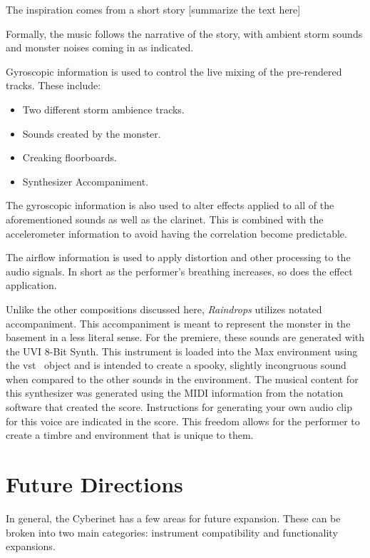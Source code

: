 The inspiration comes from a short story [summarize the text here]

Formally, the music follows the narrative of the story, with ambient storm sounds and monster noises coming in as indicated. 

Gyroscopic information is used to control the live mixing of the pre-rendered tracks. These include:
\begin{itemize}
    \item Two different storm ambience tracks.
    \item Sounds created by the monster.
    \item Creaking floorboards.
    \item Synthesizer Accompaniment.
\end{itemize}

The gyroscopic information is also used to alter effects applied to all of the aforementioned sounds as well as the clarinet. This is combined with the accelerometer information to avoid having the correlation become predictable.

The airflow information is used to apply distortion and other processing to the audio signals. In short as the performer's breathing increases, so does the effect application.

Unlike the other compositions discussed here, \textit{Raindrops} utilizes notated accompaniment. This accompaniment is meant to represent the monster in the basement in a less literal sense. For the premiere, these sounds are generated with the UVI 8-Bit Synth. This instrument is loaded into the Max environment using the vst~ object and is intended to create a spooky, slightly incongruous sound when compared to the other sounds in the environment. 
The musical content for this synthesizer was generated using the MIDI information from the notation software that created the score. Instructions for generating your own audio clip for this voice are indicated in the score. This freedom allows for the performer to create a timbre and environment that is unique to them.

\chapter{Future Directions}

In general, the Cyberinet has a few areas for future expansion. These can be broken into two main categories: instrument compatibility and functionality expansions. 

